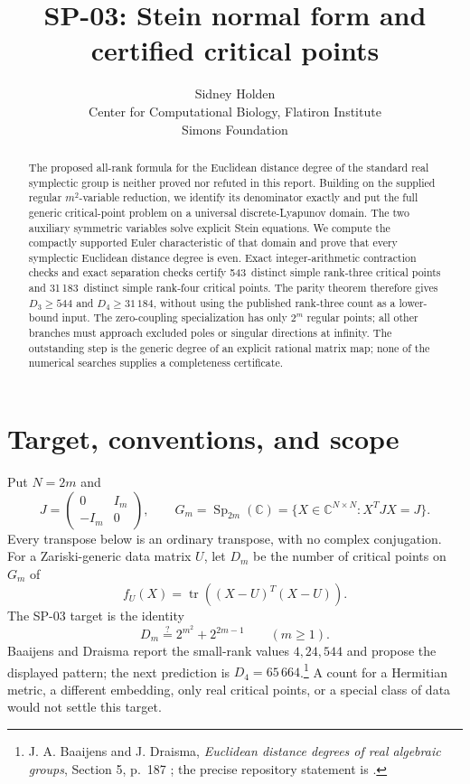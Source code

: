 \documentclass[11pt]{article}
\title{SP-03: Stein normal form and certified critical points}
\author{Sidney Holden\\{\small Center for Computational Biology, Flatiron Institute}\\{\small Simons Foundation}}\date{}
\theoremstyle{remark}\newtheorem{remark}[theorem]{Remark}
\DeclareMathOperator{\tr}{tr}
\DeclareMathOperator{\Sp}{Sp}
\newcommand{\CC}{\mathbb C}
\newcommand{\rankfourroots}{31\,183}
\newcommand{\rankfourbound}{31\,184}
\newcommand{\rankthreeroots}{543}
\begin{document}
\maketitle
\begin{abstract}
The proposed all-rank formula for the Euclidean distance degree of the standard real symplectic group is neither proved nor refuted in this report. Building on the supplied regular $m^2$-variable reduction, we identify its denominator exactly and put the full generic critical-point problem on a universal discrete-Lyapunov domain. The two auxiliary symmetric variables solve explicit Stein equations. We compute the compactly supported Euler characteristic of that domain and prove that every symplectic Euclidean distance degree is even. Exact integer-arithmetic contraction checks and exact separation checks certify \rankthreeroots\ distinct simple rank-three critical points and \rankfourroots\ distinct simple rank-four critical points. The parity theorem therefore gives $D_3\ge544$ and $D_4\ge\rankfourbound$, without using the published rank-three count as a lower-bound input. The zero-coupling specialization has only $2^m$ regular points; all other branches must approach excluded poles or singular directions at infinity. The outstanding step is the generic degree of an explicit rational matrix map; none of the numerical searches supplies a completeness certificate.
\end{abstract}

\section{Target, conventions, and scope}
Put $N=2m$ and
\[
J=\begin{pmatrix}0&I_m\\-I_m&0\end{pmatrix},\qquad
G_m=\Sp_{2m}(\CC)=\{X\in\CC^{N\times N}:X^TJX=J\}.
\]
Every transpose below is an ordinary transpose, with no complex conjugation. For a Zariski-generic data matrix $U$, let $D_m$ be the number of critical points on $G_m$ of
\[
f_U(X)=\tr((X-U)^T(X-U)).
\]
The SP-03 target is the identity
\begin{equation}\label{eq:target}
D_m\stackrel{?}{=}2^{m^2}+2^{2m-1}\qquad(m\ge1).
\end{equation}
Baaijens and Draisma report the small-rank values $4,24,544$ and propose the displayed pattern; the next prediction is $D_4=65\,664$.\footnote{J. A. Baaijens and J. Draisma, \emph{Euclidean distance degrees of real algebraic groups}, Section 5, p.~187 \cite{BD}; the precise repository statement is \cite{repo}.} A count for a Hermitian metric, a different embedding, only real critical points, or a special class of data would not settle this target.
\end{document}
